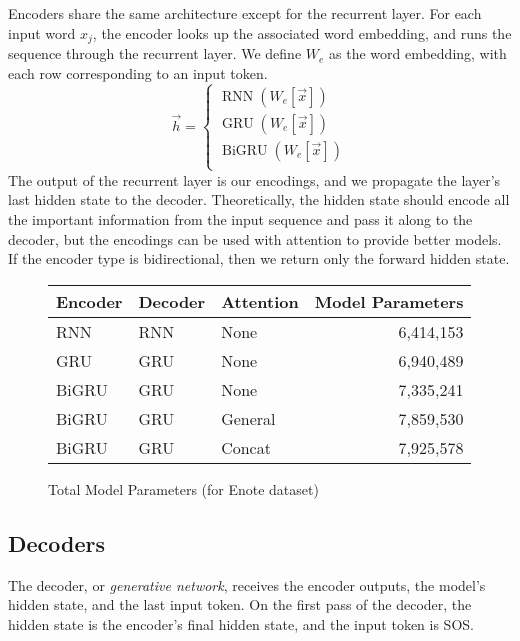\documentclass[twoside,twocolumn]{article}
\begin{document}
Encoders share the same architecture except for the recurrent layer.
For each input word $x_j$, the encoder looks up the associated word embedding,
and runs the sequence through the recurrent layer. We define $W_e$ as the word
embedding, with each row corresponding to an input token.
\begin{equation}
  \vec{h} = \begin{cases}
    \operatorname{RNN} (W_e[\vec{x}]) \\
    \operatorname{GRU} (W_e[\vec{x}]) \\
    \operatorname{BiGRU} (W_e[\vec{x}]) \\
  \end{cases}
\end{equation}
The output of the recurrent layer is our encodings, and we propagate
the layer's last hidden state to the decoder. Theoretically, the hidden
state should encode all the important information from the input sequence
and pass it along to the decoder, but the
encodings can be used with attention to provide better models. If the encoder
type is bidirectional, then we return only the forward hidden state.
\begin{figure*}
    \centering
    \begin{tabular}{ |l|l|l|r| }
        \hline
        \textbf{Encoder}
          & \textbf{Decoder}
          & \textbf{Attention}
          & \textbf{Model Parameters}\\
        \hline
        RNN & RNN & None & 6,414,153 \\ \hline
        GRU & GRU & None & 6,940,489 \\ \hline
        BiGRU & GRU & None & 7,335,241 \\ \hline
        BiGRU & GRU & General & 7,859,530 \\ \hline
        BiGRU & GRU & Concat & 7,925,578 \\ \hline
    \end{tabular}

    \caption{Total Model Parameters (for Enote dataset)}
    \label{fig:data-lines-enotes}
\end{figure*}
\subsection{Decoders}
The decoder, or \emph{generative network}, receives the encoder outputs, the
model's hidden state, and the last input token. On the first pass of the
decoder, the hidden state is the encoder's final hidden state, and the
input token is SOS.
\end{document}
